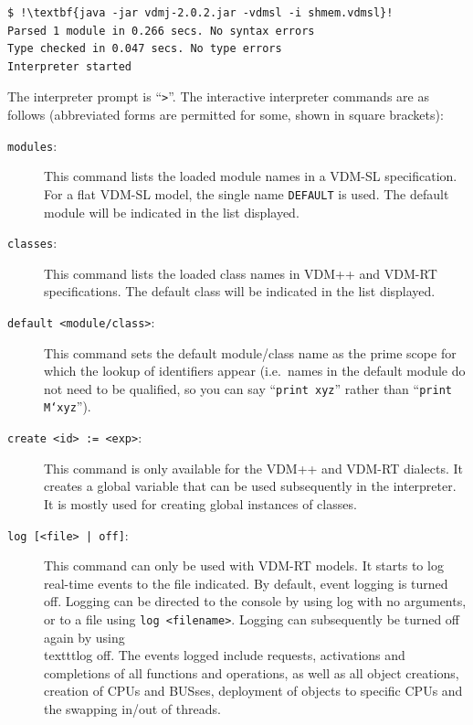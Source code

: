 \documentclass{overturerepchap}
\begin{document}
\begin{lstlisting}
$ !\textbf{java -jar vdmj-2.0.2.jar -vdmsl -i shmem.vdmsl}!
Parsed 1 module in 0.266 secs. No syntax errors
Type checked in 0.047 secs. No type errors
Interpreter started
\end{lstlisting}

The interpreter prompt is ``\texttt{>}''. The 
interactive interpreter commands are as follows (abbreviated forms are
permitted for some, shown in square brackets): 

\begin{description}
\item[\texttt{modules}:] This command lists the loaded module names in
  a VDM-SL specification. For a flat VDM-SL model, the single name
  \texttt{DEFAULT} is used. The default module will be indicated in
  the list displayed.
\item[\texttt{classes}:] This command lists the loaded class names in
  VDM++ and VDM-RT specifications. The default class will be indicated in
  the list displayed.
\item[\texttt{default <module/class>}:] This command sets the default
  module/class name as the prime scope for which the lookup of
  identifiers appear (i.e.\ names in the default module
  do not need to be qualified, so you can say ``\texttt{print xyz}'' rather than
``\texttt{print M`xyz}'').
\item[\texttt{create <id> := <exp>}:] This command is only available
  for the VDM++ and VDM-RT dialects. It creates a global variable that
  can be used subsequently in the interpreter. It is mostly used for
  creating global instances of classes. 
\item[\texttt{log [<file> | off]}:] This command can only be used with
  VDM-RT models. It starts to log real-time events to the file indicated. By
  default, event logging is turned off. Logging can be directed to
  the console by using log with no arguments, or to a file using \texttt{log
  <filename>}. Logging can subsequently be turned off again by using
  \\texttt{log off}. The events logged include requests, activations and
  completions of all functions and operations, as well as all object creations,
  creation of CPUs and BUSses, deployment of objects
  to specific CPUs and the swapping in/out of threads.  

\end{description}
\end{document}
